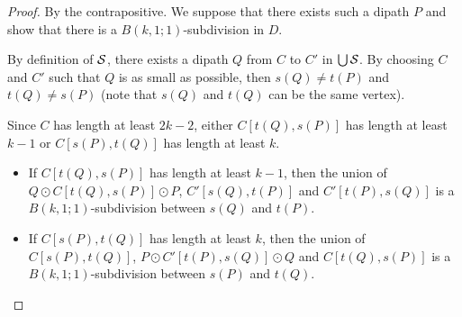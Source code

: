 \documentclass[utf8,10pt]{article}
\theoremstyle{plain}
\theoremstyle{definition}
\theoremstyle{remark}
\begin{document}
\begin{proof}
By the contrapositive. We suppose that there exists such a dipath $P$ and show that there is a $B(k,1;1)$-subdivision in $D$.

By definition of ${\cal S}$, there exists a dipath $Q$ from $C$ to $C'$ in $\bigcup {\cal S}$. By choosing $C$ and $C'$ such that 
$Q$ is as small as possible, then $s(Q) \not = t(P)$ and $t(Q) \not = s(P)$ (note that $s(Q)$ and $t(Q)$ can be the same vertex). 

Since $C$ has length at least $2k-2$, either $C[t(Q), s(P)]$ has length at least $k-1$ or $C[s(P), t(Q)]$ has length at least $k$. 

\begin{itemize}
	\item If $C[t(Q), s(P)]$ has length at least $k-1$, then the union of $Q \odot C[t(Q), s(P)] \odot P$, $C'[s(Q), t(P)]$ and $C'[ t(P), s(Q)]$
	is a $B(k,1;1)$-subdivision between $s(Q)$ and $t(P)$. 
	\item If $C[s(P), t(Q)]$ has length at least $k$, then the union of $C[s(P), t(Q)]$, $P \odot C'[t(P), s(Q)] \odot Q$ and $C[t(Q), s(P)]$
	is a $B(k,1;1)$-subdivision between $s(P)$ and $t(Q)$. 
\end{itemize}
\end{proof}
\end{document}
